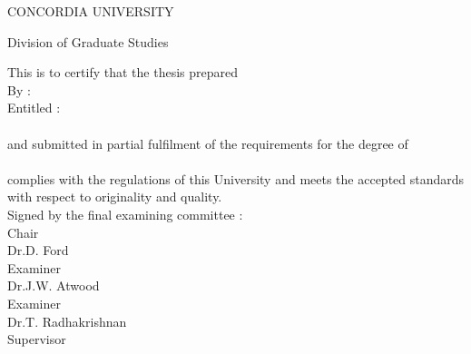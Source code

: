 {  \begin{titlepage}
     \vspace*{1ex}
     \begin{center}
        CONCORDIA UNIVERSITY
     \end{center}
     \begin{center}
        Division of Graduate Studies
     \end{center}
     \vspace{3ex}
     This is to certify that the thesis prepared\\[2ex]
     By :\hspace{40pt}{\bf Lawrence A. Hegarty}\\[2ex]
     Entitled :\hspace*{13pt}{\bf Implementing the Dee System:}\\ 
     \hspace*{62pt}{\bf Issues and Experiences} \\[2ex]
    and submitted in partial fulfilment of the requirements for the degree
    of\\[2ex]
    \hspace*{62pt}{\bf Master of Computer Science}\\[2ex]
    complies with the regulations of this University and meets the accepted
    standards with respect to originality and quality. \\[2ex]
    Signed by the final examining committee : \\[5ex]
    \hspace*{77pt}\underline{\hspace{234pt}} Chair\\
    \hspace*{77pt}Dr.\@ D. Ford\\[2.5ex]
    \hspace*{77pt}\underline{\hspace{234pt}} Examiner\\
    \hspace*{77pt}Dr.\@ J.W. Atwood\\[2.5ex]
    \hspace*{77pt}\underline{\hspace{234pt}} Examiner\\
    \hspace*{77pt}Dr.\@ T. Radhakrishnan\\[2.5ex]
    \hspace*{77pt}\underline{\hspace{234pt}} Supervisor \\

\end{titlepage}}

